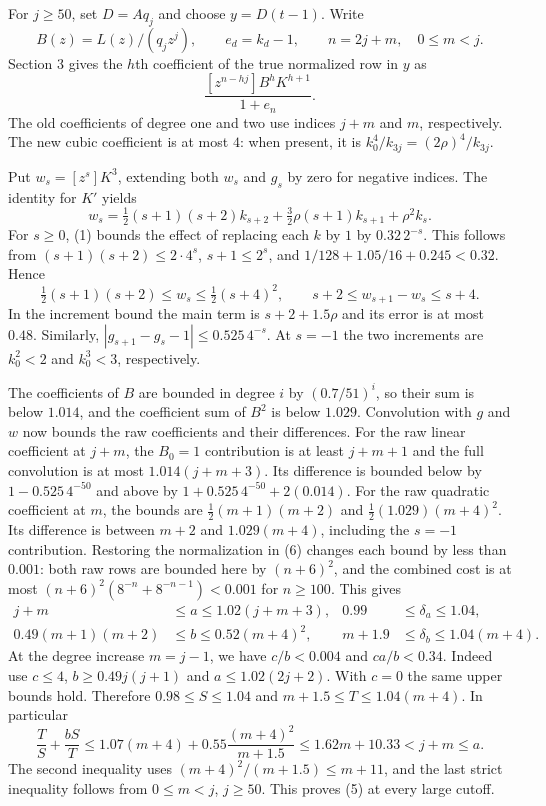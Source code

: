 \documentclass[11pt]{article}
\begin{document}
For \(j\ge50\), set \(D=Aq_j\) and choose \(y=D(t-1)\). Write
\[
B(z)=L(z)/(q_jz^j),\qquad e_d=k_d-1,\qquad n=2j+m,\quad 0\le m<j .
\]
Section 3 gives the \(h\)th coefficient of the true normalized row in \(y\) as
\[
\frac{[z^{n-hj}]B^hK^{h+1}}{1+e_n}.
\tag{6}
\]
The old coefficients of degree one and two use indices \(j+m\) and \(m\), respectively. The new cubic coefficient is at most \(4\): when present, it is \(k_0^4/k_{3j}=(2\rho)^4/k_{3j}\).

Put \(w_s=[z^s]K^3\), extending both \(w_s\) and \(g_s\) by zero for negative indices. The identity for \(K'\) yields
\[
w_s=\tfrac12(s+1)(s+2)k_{s+2}
     +\tfrac32\rho(s+1)k_{s+1}+\rho^2 k_s.
\]
For \(s\ge0\), (1) bounds the effect of replacing each \(k\) by \(1\) by \(0.32\,2^{-s}\). This follows from \((s+1)(s+2)\le2\cdot4^s\), \(s+1\le2^s\), and \(1/128+1.05/16+0.245<0.32\). Hence
\[
\tfrac12(s+1)(s+2)\le w_s\le\tfrac12(s+4)^2,\qquad
s+2\le w_{s+1}-w_s\le s+4.
\]
In the increment bound the main term is \(s+2+1.5\rho\) and its error is at most \(0.48\). Similarly, \(|g_{s+1}-g_s-1|\le0.525\,4^{-s}\). At \(s=-1\) the two increments are \(k_0^2<2\) and \(k_0^3<3\), respectively.

The coefficients of \(B\) are bounded in degree \(i\) by \((0.7/51)^i\), so their sum is below \(1.014\), and the coefficient sum of \(B^2\) is below \(1.029\). Convolution with \(g\) and \(w\) now bounds the raw coefficients and their differences. For the raw linear coefficient at \(j+m\), the \(B_0=1\) contribution is at least \(j+m+1\) and the full convolution is at most \(1.014(j+m+3)\). Its difference is bounded below by \(1-0.525\,4^{-50}\) and above by \(1+0.525\,4^{-50}+2(0.014)\). For the raw quadratic coefficient at \(m\), the bounds are \(\tfrac12(m+1)(m+2)\) and \(\tfrac12(1.029)(m+4)^2\). Its difference is between \(m+2\) and \(1.029(m+4)\), including the \(s=-1\) contribution. Restoring the normalization in (6) changes each bound by less than \(0.001\): both raw rows are bounded here by \((n+6)^2\), and the combined cost is at most \((n+6)^2(8^{-n}+8^{-n-1})<0.001\) for \(n\ge100\). This gives
\[
\begin{aligned}
j+m&\le a\le1.02(j+m+3),&
0.99&\le\delta_a\le1.04,\\
0.49(m+1)(m+2)&\le b\le0.52(m+4)^2,&
m+1.9&\le\delta_b\le1.04(m+4).
\end{aligned}
\]
At the degree increase \(m=j-1\), we have \(c/b<0.004\) and \(ca/b<0.34\). Indeed use \(c\le4\), \(b\ge0.49j(j+1)\) and \(a\le1.02(2j+2)\). With \(c=0\) the same upper bounds hold. Therefore \(0.98\le S\le1.04\) and \(m+1.5\le T\le1.04(m+4)\). In particular
\[
\frac{T}{S}+\frac{bS}{T}
\le1.07(m+4)+0.55\frac{(m+4)^2}{m+1.5}
\le1.62m+10.33<j+m\le a .
\]
The second inequality uses \((m+4)^2/(m+1.5)\le m+11\), and the last strict inequality follows from \(0\le m<j\), \(j\ge50\). This proves (5) at every large cutoff.
\end{document}
